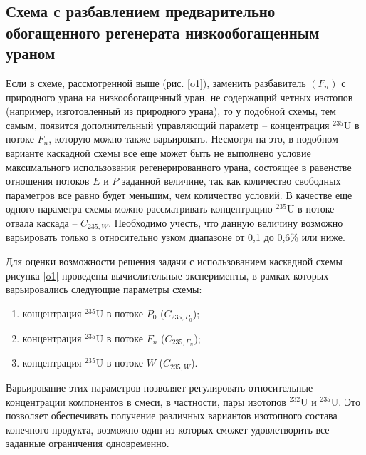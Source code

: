 \subsection{Схема с разбавлением предварительно обогащенного регенерата низкообогащенным ураном}

Если в схеме, рассмотренной выше (рис. \ref{o1}), заменить разбавитель $(F_n)$ с природного урана на низкообогащенный уран, не содержащий четных изотопов (например, изготовленный из природного урана), то у подобной схемы, тем самым, появится дополнительный управляющий параметр -- концентрация $^{235}$U в потоке $F_n$, которую можно также варьировать.  Несмотря на это, в подобном варианте каскадной схемы все еще может быть не выполнено условие максимального использования регенерированного урана, состоящее в равенстве отношения потоков $E$ и $P$ заданной величине, так как количество свободных параметров все равно будет меньшим, чем количество условий. В качестве еще одного параметра схемы можно рассматривать концентрацию $^{235}$U в потоке отвала каскада -- $C_{235, W}$. Необходимо учесть, что данную величину возможно варьировать только в относительно узком диапазоне от 0,1 до 0,6\% или ниже. 

Для оценки возможности решения задачи с использованием каскадной схемы рисунка \ref{o1} проведены вычислительные эксперименты, в рамках которых варьировались следующие параметры схемы:
\begin{enumerate}
  \item концентрация $^{235}$U в потоке $P_0$ ($C_{235, P_0}$);
  \item концентрация $^{235}$U в потоке $F_n$ ($C_{235, F_n}$);
  \item концентрация $^{235}$U в потоке $W$ ($C_{235, W}$).
\end{enumerate}

Варьирование этих параметров позволяет регулировать относительные концентрации компонентов в смеси, в частности, пары изотопов $^{232}$U и $^{235}$U. Это позволяет обеспечивать получение различных вариантов изотопного состава конечного продукта, возможно один из которых сможет удовлетворить все заданные ограничения одновременно. 


